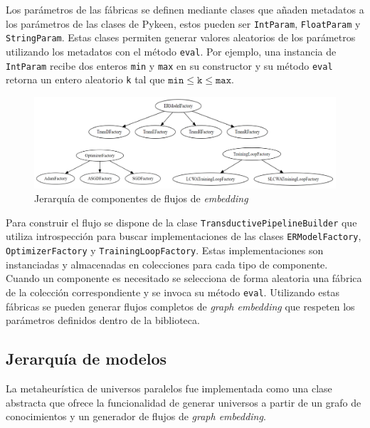 Los par\'ametros de las f\'abricas se definen mediante clases que a\~naden metadatos a los par\'ametros de
las clases de Pykeen, estos pueden ser \texttt{IntParam}, \texttt{FloatParam} y \texttt{StringParam}.
Estas clases permiten generar valores aleatorios de los par\'ametros utilizando
los metadatos con el m\'etodo \texttt{eval}. Por ejemplo, una instancia de \texttt{IntParam}
recibe dos enteros \texttt{min} y \texttt{max} en su constructor y su m\'etodo \texttt{eval} retorna
un entero aleatorio \texttt{k} tal que $\texttt{min} \leq \texttt{k} \leq \texttt{max}$.

\begin{figure}[h!]
    \includegraphics[width=\linewidth]{Graphics/components.png}
    \caption{Jerarqu\'ia de componentes de flujos de \textit{embedding}}
    \label{fig: emb-hierarchy}
\end{figure}

Para construir el flujo se dispone de la clase \texttt{TransductivePipelineBuilder} que utiliza introspecci\'on para
buscar implementaciones de las clases \texttt{ERModelFactory}, \texttt{OptimizerFactory} y
\texttt{TrainingLoopFactory}. Estas implementaciones son instanciadas y almacenadas
en colecciones para cada tipo de componente. Cuando un componente es necesitado se selecciona de
forma aleatoria una f\'abrica de la colecci\'on correspondiente y se invoca su m\'etodo \texttt{eval}.
Utilizando estas f\'abricas se pueden generar flujos completos de \textit{graph embedding} que respeten los par\'ametros definidos dentro de la biblioteca.

\subsection{Jerarqu\'ia de modelos}

La metaheur\'istica de universos paralelos fue implementada como
una clase abstracta que ofrece la funcionalidad de generar universos
a partir de un grafo de conocimientos y un
generador de flujos de \textit{graph embedding}.

